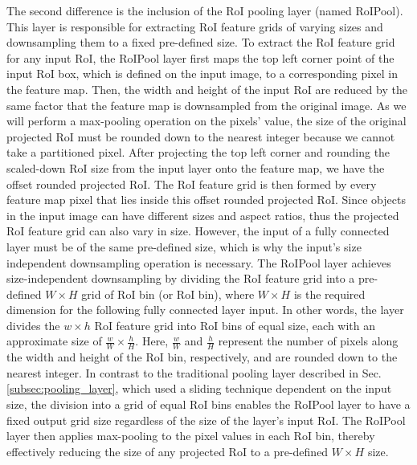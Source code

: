 The second difference is the inclusion of the RoI pooling layer (named RoIPool). This layer is responsible for extracting RoI feature grids of varying sizes and downsampling them to a fixed pre-defined size. To extract the RoI feature grid for any input RoI, the RoIPool layer first maps the top left corner point of the input RoI box, which is defined on the input image, to a corresponding pixel in the feature map. Then, the width and height of the input RoI are reduced by the same factor that the feature map is downsampled from the original image. As we will perform a max-pooling operation on the pixels' value, the size of the original projected RoI must be rounded down to the nearest integer because we cannot take a partitioned pixel. After projecting the top left corner and rounding the scaled-down RoI size from the input layer onto the feature map, we have the offset rounded projected RoI. The RoI feature grid is then formed by every feature map pixel that lies inside this offset rounded projected RoI. Since objects in the input image can have different sizes and aspect ratios, thus the projected RoI feature grid can also vary in size. However, the input of a fully connected layer must be of the same pre-defined size, which is why the input's size independent downsampling operation is necessary. The RoIPool layer achieves size-independent downsampling by dividing the RoI feature grid into a pre-defined $W \times H$ grid of RoI bin (or RoI bin), where $W \times H$ is the required dimension for the following fully connected layer input. In other words, the layer divides the $w \times h$ RoI feature grid into RoI bins of equal size, each with an approximate size of $\frac{w}{W} \times \frac{h}{H}$. Here, $\frac{w}{W}$ and $\frac{h}{H}$ represent the number of pixels along the width and height of the RoI bin, respectively, and are rounded down to the nearest integer. In contrast to the traditional pooling layer described in Sec. \ref{subsec:pooling_layer}, which used a sliding technique dependent on the input size, the division into a grid of equal RoI bins enables the RoIPool layer to have a fixed output grid size regardless of the size of the layer's input RoI. The RoIPool layer then applies max-pooling to the pixel values in each RoI bin, thereby effectively reducing the size of any projected RoI to a pre-defined $W \times H$ size.

